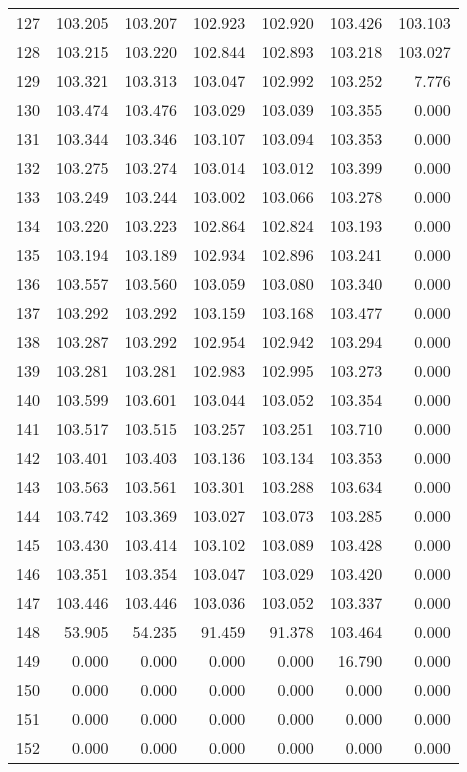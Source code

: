 \begin{tabular}{|rrrrrrr|}
127 & 103.205 & 103.207 & 102.923 & 102.920 & 103.426 & 103.103\\
128 & 103.215 & 103.220 & 102.844 & 102.893 & 103.218 & 103.027\\
129 & 103.321 & 103.313 & 103.047 & 102.992 & 103.252 & 7.776\\
130 & 103.474 & 103.476 & 103.029 & 103.039 & 103.355 & 0.000\\
131 & 103.344 & 103.346 & 103.107 & 103.094 & 103.353 & 0.000\\
132 & 103.275 & 103.274 & 103.014 & 103.012 & 103.399 & 0.000\\
133 & 103.249 & 103.244 & 103.002 & 103.066 & 103.278 & 0.000\\
134 & 103.220 & 103.223 & 102.864 & 102.824 & 103.193 & 0.000\\
135 & 103.194 & 103.189 & 102.934 & 102.896 & 103.241 & 0.000\\
136 & 103.557 & 103.560 & 103.059 & 103.080 & 103.340 & 0.000\\
137 & 103.292 & 103.292 & 103.159 & 103.168 & 103.477 & 0.000\\
138 & 103.287 & 103.292 & 102.954 & 102.942 & 103.294 & 0.000\\
139 & 103.281 & 103.281 & 102.983 & 102.995 & 103.273 & 0.000\\
140 & 103.599 & 103.601 & 103.044 & 103.052 & 103.354 & 0.000\\
141 & 103.517 & 103.515 & 103.257 & 103.251 & 103.710 & 0.000\\
142 & 103.401 & 103.403 & 103.136 & 103.134 & 103.353 & 0.000\\
143 & 103.563 & 103.561 & 103.301 & 103.288 & 103.634 & 0.000\\
144 & 103.742 & 103.369 & 103.027 & 103.073 & 103.285 & 0.000\\
145 & 103.430 & 103.414 & 103.102 & 103.089 & 103.428 & 0.000\\
146 & 103.351 & 103.354 & 103.047 & 103.029 & 103.420 & 0.000\\
147 & 103.446 & 103.446 & 103.036 & 103.052 & 103.337 & 0.000\\
148 & 53.905 & 54.235 & 91.459 & 91.378 & 103.464 & 0.000\\
149 & 0.000 & 0.000 & 0.000 & 0.000 & 16.790 & 0.000\\
150 & 0.000 & 0.000 & 0.000 & 0.000 & 0.000 & 0.000\\
151 & 0.000 & 0.000 & 0.000 & 0.000 & 0.000 & 0.000\\
152 & 0.000 & 0.000 & 0.000 & 0.000 & 0.000 & 0.000\\
\hline
\end{tabular}
